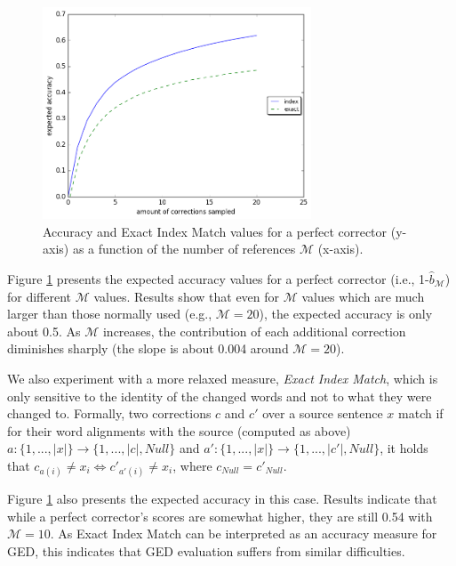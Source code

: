 \documentclass[letterpaper, 11pt]{article}
\begin{document}
\begin{figure}
	\vspace{-1em}
  \includegraphics[width=8cm]{noSig_repeat_1000_accuracy}
  \caption{Accuracy and Exact Index Match values for a perfect corrector (y-axis)
    as a function of the number of references $\mathcal{M}$ (x-axis).
  } \label{fig:accuracy_vals}
  \vspace{-0.5cm}
\end{figure}

Figure \ref{fig:accuracy_vals} presents the expected accuracy values for a perfect
corrector (i.e., 1-$\hat{b}_\mathcal{M}$) for different  $\mathcal{M}$ values. 
Results show that even for $\mathcal{M}$ values which are much larger than those normally used (e.g., $\mathcal{M}=20$),
the expected accuracy is only about 0.5. As $\mathcal{M}$ increases, the contribution of each additional correction diminishes sharply (the slope is about 0.004 around $\mathcal{M}=20$).

We also experiment with a more relaxed measure, {\it Exact Index Match}, which is only sensitive to the identity of the changed words and not to what they were changed to. 
Formally, two corrections $c$ and $c'$ over a source sentence $x$ match if for their word alignments with the source (computed as above) $a:\{1,...,\left|x\right|\} \rightarrow \{1,...,\left|c\right|,Null\}$
and $a':\{1,...,\left|x\right|\} \rightarrow \{1,...,\left|c'\right|,Null\}$, it holds that $c_{a\left(i\right)} \neq x_{i} \Leftrightarrow c'_{a'\left(i\right)} \neq x_{i}$, where $c_{Null}=c'_{Null}$.

Figure \ref{fig:accuracy_vals} also presents the expected accuracy in this case. Results indicate that while a perfect corrector's scores are somewhat higher, they are still 0.54 with $\mathcal{M}=10$.
As Exact Index Match can be interpreted as an accuracy measure for GED, this indicates that GED evaluation suffers from similar difficulties.
\end{document}
